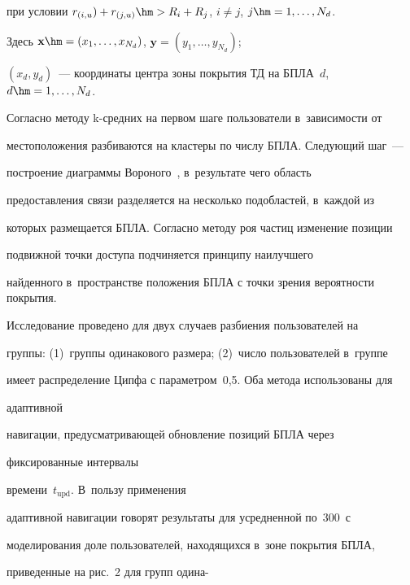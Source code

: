 при условии $r_{(i,u})+r_{(j,u)}\hm> R_i+R_j$, $i\not=j$, $j\hm=1, \ldots , N_d$.


%


Здесь $\mathbf{x}\hm=(x_1, \ldots , x_{N_d})$, $\mathbf{y}=(y_1,\ldots , y_{N_d})$; 


$(x_d,y_d)$~--- координаты центра зоны покрытия ТД на БПЛА~$d$, $d\hm=1, 


\ldots , N_d$.





  Согласно методу k-средних на первом шаге пользователи в~зависимости от 


местоположения разбиваются на кластеры по числу БПЛА. Следующий шаг~---


 построение диаграммы Вороного~\cite{22-md}, в~результате чего область 


предоставления связи разделяется на несколько подобластей, в~каждой из 


которых размещается БПЛА. Согласно методу роя частиц изменение позиции 


подвижной точки доступа подчиняется принципу наилучшего 


найденного в~пространстве положения БПЛА с точки зрения вероятности покрытия. 











  


  Исследование проведено для двух случаев разбиения пользователей на 


группы: (1)~группы одинакового размера; (2)~число пользователей в~группе 


имеет распределение Ципфа с параметром~0,5. Оба метода использованы для 


адаптивной


 навигации, предусматривающей об\-нов\-ле\-ние позиций БПЛА через


 фиксированные интервалы


 времени~$t_{\mathrm{upd}}$. В~пользу применения 


адаптивной навигации говорят результаты для усредненной по~300~с 


моделирования доле пользователей, находящихся в~зоне покрытия БПЛА, 


приведенные на рис.~2 для групп одина-\linebreak\vspace*{-12pt}





